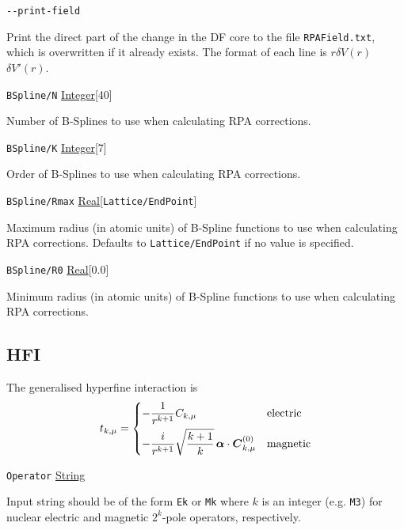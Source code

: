\documentclass{report}
\begin{document}
\texttt{{-}{-}print-field}
\begin{adjustwidth}{1cm}{}
Print the direct part of the change in the DF core to the file \texttt{RPAField.txt},
which is overwritten if it already exists. The format of each line is
\quad $r$\quad $\delta V(r)$\quad $\delta V'(r)$.
\end{adjustwidth}

\texttt{BSpline/N} \uline{Integer}[40]
\begin{adjustwidth}{1cm}{}
Number of B-Splines to use when calculating RPA corrections.
\end{adjustwidth}

\texttt{BSpline/K} \uline{Integer}[7]
\begin{adjustwidth}{1cm}{}
Order of B-Splines to use when calculating RPA corrections.
\end{adjustwidth}

\texttt{BSpline/Rmax} \uline{Real}[\texttt{Lattice/EndPoint}]
\begin{adjustwidth}{1cm}{}
Maximum radius (in atomic units) of B-Spline functions to use when calculating RPA corrections. 
Defaults to \texttt{Lattice/EndPoint} if no value is specified.
\end{adjustwidth}

\texttt{BSpline/R0} \uline{Real}[0.0]
\begin{adjustwidth}{1cm}{}
Minimum radius (in atomic units) of B-Spline functions to use when calculating RPA corrections.
\end{adjustwidth}

\subsection{HFI}
\label{sec:HFI}

The generalised hyperfine interaction is
\[
t_{k,\mu} = \begin{dcases}
-\frac{1}{r^{k+1}}C_{k,\mu} & \textrm{electric} \\
-\frac{i}{r^{k+1}}\sqrt{\frac{k+1}{k}}\, \boldsymbol{\alpha}\cdot\boldsymbol{C}^{(0)}_{k,\mu} & \textrm{magnetic}
\end{dcases}
\]

\texttt{Operator} \uline{String}
\begin{adjustwidth}{1cm}{}
Input string should be of the form \texttt{Ek} or \texttt{Mk} where $k$ is an integer (e.g. \texttt{M3}) for nuclear electric and magnetic $2^k$-pole operators, respectively.
\end{adjustwidth}
\end{document}
